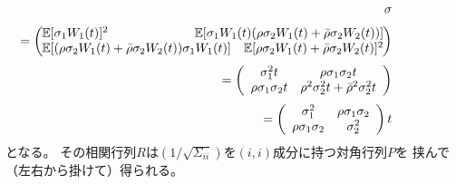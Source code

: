 \documentclass[uplatex,a4j,12pt,dvipdfmx]{jsarticle}
\begin{document}
\begin{eqnarray*}
	&&
	\hspace{-10mm} \mathbb{\sigma}
	\\[1mm] && \hspace{-20mm} \ =
	\left(
	\hspace{-2mm}
	\begin{array}{lr}
		\mathbb{E}[\sigma_{1} W_{1}(t)]^{2}
		 &
		\hspace{-20mm}
		\mathbb{E}[\sigma_{1} W_{1}(t) (\rho \sigma_{2} W_{1}(t) + \bar{\rho} \sigma_{2} W_{2}(t))]
		\\
		\mathbb{E}[(\rho \sigma_{2} W_{1}(t) + \bar{\rho} \sigma_{2} W_{2}(t))\sigma_{1} W_{1}(t)]
		 &
		\mathbb{E}[\rho \sigma_{2} W_{1}(t) + \bar{\rho} \sigma_{2} W_{2}(t)]^{2}
	\end{array}
	\hspace{-2mm}
	\right)
	\\[1mm] && \hspace{-20mm} \ =
	\left(
	\begin{array}{cc}
			\sigma_{1}^{2} t             & \rho \sigma_{1} \sigma_{2} t
			\\
			\rho \sigma_{1} \sigma_{2} t & \rho^{2} \sigma_{2}^{2} t + \bar{\rho}^{2} \sigma^{2}_{2} t
		\end{array}
	\right)
	\\[1mm] && \hspace{-20mm} \ =
	\left(
	\begin{array}{cc}
			\sigma_{1}^{2}             & \rho \sigma_{1} \sigma_{2}
			\\
			\rho \sigma_{1} \sigma_{2} & \sigma^{2}_{2}
		\end{array}
	\right)
	t
\end{eqnarray*}
%
%
となる。
その相関行列$R$は$(1/\sqrt{\Sigma_{ii}})$を$(i,i)$成分に持つ対角行列$P$を
挟んで（左右から掛けて）得られる。
%
%
\end{document}
